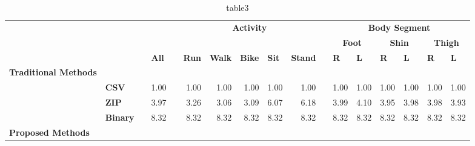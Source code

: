 \documentclass[journal]{IEEEtran}
\begin{document}
\begin{table}[htbp]
{\begin{tabular}{|l|r|r|r|r|r|r|r|r|r|r|r|r|}
\end{tabular}%
}%

\end{table}


\begin{table}[htbp]
\caption{table3}
\begin{tabular}{lllrlrrrrrlrrrrrr}

 &  &  & \multicolumn{1}{l}{} &  & \multicolumn{ 5}{c}{\textbf{Activity}} &  & \multicolumn{ 6}{c}{\textbf{Body Segment}} \\ 
\multicolumn{1}{c}{\textbf{}} & \multicolumn{1}{c}{\textbf{}} & \multicolumn{1}{c}{\textbf{}} & \multicolumn{1}{c}{\textbf{}} & \multicolumn{1}{c}{\textbf{}} & \multicolumn{1}{c}{\textbf{}} & \multicolumn{1}{c}{\textbf{}} & \multicolumn{1}{c}{\textbf{}} & \multicolumn{1}{c}{\textbf{}} & \multicolumn{1}{c}{\textbf{}} & \multicolumn{1}{c}{\textbf{}} & \multicolumn{ 2}{c}{\textbf{Foot}} & \multicolumn{ 2}{c}{\textbf{Shin}} & \multicolumn{ 2}{c}{\textbf{Thigh}} \\ 
\textbf{} & \textbf{} & \textbf{} & \multicolumn{1}{l}{\textbf{All}} & \textbf{} & \multicolumn{1}{l}{\textbf{Run}} & \multicolumn{1}{l}{\textbf{Walk}} & \multicolumn{1}{l}{\textbf{Bike}} & \multicolumn{1}{l}{\textbf{Sit}} & \multicolumn{1}{l}{\textbf{Stand}} & \textbf{} & \multicolumn{1}{l}{\textbf{R}} & \multicolumn{1}{l}{\textbf{L}} & \multicolumn{1}{l}{\textbf{R}} & \multicolumn{1}{l}{\textbf{L}} & \multicolumn{1}{l}{\textbf{R}} & \multicolumn{1}{l}{\textbf{L}} \\ 
\textbf{Traditional Methods} & \textbf{} & \textbf{} & \multicolumn{1}{l}{\textbf{}} & \textbf{} & \multicolumn{1}{l}{\textbf{}} & \multicolumn{1}{l}{\textbf{}} & \multicolumn{1}{l}{\textbf{}} & \multicolumn{1}{l}{\textbf{}} & \multicolumn{1}{l}{\textbf{}} & \textbf{} & \multicolumn{1}{l}{\textbf{}} & \multicolumn{1}{l}{\textbf{}} & \multicolumn{1}{l}{\textbf{}} & \multicolumn{1}{l}{\textbf{}} & \multicolumn{1}{l}{\textbf{}} & \multicolumn{1}{l}{\textbf{}} \\ 
 & \textbf{CSV} &  & 1.00 &  & 1.00 & 1.00 & 1.00 & 1.00 & 1.00 &  & 1.00 & 1.00 & 1.00 & 1.00 & 1.00 & 1.00 \\ 
 & \textbf{ZIP} &  & 3.97 &  & 3.26 & 3.06 & 3.09 & 6.07 & 6.18 &  & 3.99 & 4.10 & 3.95 & 3.98 & 3.98 & 3.93 \\ 
 & \textbf{Binary} &  & 8.32 &  & 8.32 & 8.32 & 8.32 & 8.32 & 8.32 &  & 8.32 & 8.32 & 8.32 & 8.32 & 8.32 & 8.32 \\ 
\textbf{Proposed Methods} & \textbf{} &  & \multicolumn{1}{l}{} &  & \multicolumn{1}{l}{} & \multicolumn{1}{l}{} & \multicolumn{1}{l}{} & \multicolumn{1}{l}{} & \multicolumn{1}{l}{} &  & \multicolumn{1}{l}{} & \multicolumn{1}{l}{} & \multicolumn{1}{l}{} & \multicolumn{1}{l}{} & \multicolumn{1}{l}{} & \multicolumn{1}{l}{} \\ 

\end{tabular}
\end{table}
\end{document}
